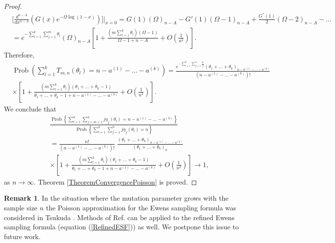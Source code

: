 \documentclass[12pt]{amsart}
\theoremstyle{definition}
\newtheorem{rem}[thm]{Remark}
\numberwithin{equation}{section}
\DeclareMathOperator{\Prob}{Prob}
\begin{document}
\begin{proof}
\begin{equation}
\begin{split}
&\biggl[\frac{d^{n-A}}{dx^{n-A}}\left(G(x)e^{-\Omega\log(1-x)}\right)\biggr]\biggl\vert_{x=0}
=G(1)\left(\Omega\right)_{n-A}-G'(1)(\Omega-1)_{n-A}+\frac{G^{''}(1)}{2}(\Omega-2)_{n-A}-\ldots\\
&=e^{-\sum\limits_{l=1}^k\sum\limits_{j=1}^{m}\theta_l}\left(\Omega\right)_{n-A}\left[1+\frac{\left(m\sum\limits_{l=1}^k\theta_l\right)(\Omega-1)}{\Omega-1+n-A}+O\left(\frac{1}{n^2}\right)\right].
\end{split}
\nonumber
\end{equation}
Therefore,
\begin{equation}\label{13.1T}
\begin{split}
&
\Prob\left(\sum\limits_{l=1}^kT_{m,n}(\theta_l)=n-a^{(1)}-\ldots-a^{(k)}\right)=\frac{e^{-\sum\limits_{l=1}^k\sum\limits_{j=1}^n\frac{\theta_l}{j}}
\left(\theta_1+\ldots+\theta_k\right)_{n-a^{(1)}-\ldots-a^{(k)}}}{(n-a^{(1)}-\ldots-a^{(k)})!}\\
&\times
\left[1+\frac{\left(m\sum\limits_{l=1}^k\theta_l\right)(\theta_1+\ldots+\theta_k-1)}{\theta_1+\ldots+\theta_k-1+n-a^{(1)}-\ldots-a^{(k)}}+O\left(\frac{1}{n^2}\right)\right].
\end{split}
\end{equation}
We conclude that
\begin{equation}
\begin{split}
&\frac{\Prob\left\{\sum\limits_{l=1}^k\sum\limits_{j=m+1}^nj\eta_j(\theta_l)=n-a^{(1)}-\ldots-a^{(k)}\right\}}{\Prob\left\{\sum\limits_{l=1}^k\sum\limits_{j=1}^nj\eta_j(\theta_l)=n\right\}}\\
&=\frac{n!}{(n-a^{(1)}-\ldots-a^{(k)})!}\;
\frac{\left(\theta_1+\ldots+\theta_k\right)_{n-a^{(1)}-\ldots-a^{(k)}}}{\left(\theta_1+\ldots+\theta_k\right)_{n}}\\
&\times
\left[1+\frac{\left(m\sum\limits_{l=1}^k\theta_l\right)(\theta_1+\ldots+\theta_k-1)}{\theta_1+\ldots+\theta_k-1+n-a^{(1)}-\ldots-a^{(k)}}+O\left(\frac{1}{n^2}\right)\right]\longrightarrow 1,
\end{split}
\end{equation}
as $n\rightarrow\infty$. Theorem \ref{TheoremConvergencePoisson} is proved.
\end{proof}
\begin{rem}In the situation where the mutation parameter grows with the sample size $n$ the Poisson approximation  for the Ewens sampling formula
was considered in Tsukuda \cite{Tsukuda1}. Methods of Ref. \cite{Tsukuda1}
can be applied to the refined Ewens sampling formula (equation (\ref{RefinedESF}))
as well.
We postpone this issue to future work.
\end{rem}
\end{document}
